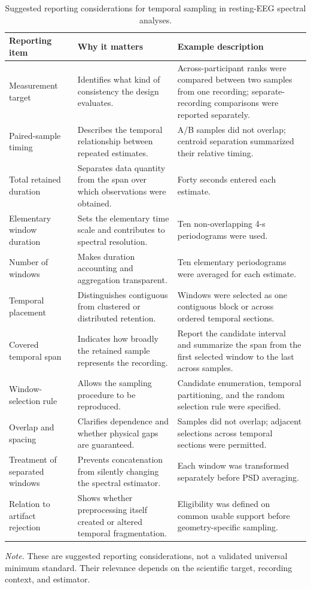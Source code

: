 \begin{table}[H]
\centering
\caption{Suggested reporting considerations for temporal sampling in resting-EEG spectral analyses.}
\label{tab:reporting}
\footnotesize
\renewcommand{\arraystretch}{1.15}
\begin{tabularx}{\textwidth}{@{}p{}p{}X@{}}
\toprule
Reporting item & Why it matters & Example description \\
\midrule
Measurement target & Identifies what kind of consistency the design evaluates. & Across-participant ranks were compared between two samples from one recording; separate-recording comparisons were reported separately. \\
Paired-sample timing & Describes the temporal relationship between repeated estimates. & A/B samples did not overlap; centroid separation summarized their relative timing. \\
Total retained duration & Separates data quantity from the span over which observations were obtained. & Forty seconds entered each estimate. \\
Elementary window duration & Sets the elementary time scale and contributes to spectral resolution. & Ten non-overlapping 4-s periodograms were used. \\
Number of windows & Makes duration accounting and aggregation transparent. & Ten elementary periodograms were averaged for each estimate. \\
Temporal placement & Distinguishes contiguous from clustered or distributed retention. & Windows were selected as one contiguous block or across ordered temporal sections. \\
Covered temporal span & Indicates how broadly the retained sample represents the recording. & Report the candidate interval and summarize the span from the first selected window to the last across samples. \\
Window-selection rule & Allows the sampling procedure to be reproduced. & Candidate enumeration, temporal partitioning, and the random selection rule were specified. \\
Overlap and spacing & Clarifies dependence and whether physical gaps are guaranteed. & Samples did not overlap; adjacent selections across temporal sections were permitted. \\
Treatment of separated windows & Prevents concatenation from silently changing the spectral estimator. & Each window was transformed separately before PSD averaging. \\
Relation to artifact rejection & Shows whether preprocessing itself created or altered temporal fragmentation. & Eligibility was defined on common usable support before geometry-specific sampling. \\
\bottomrule
\end{tabularx}
\par\smallskip
\begin{minipage}{0.98\textwidth}
\footnotesize \textit{Note.} These are suggested reporting considerations, not a validated universal minimum standard. Their relevance depends on the scientific target, recording context, and estimator.
\end{minipage}
\end{table}
